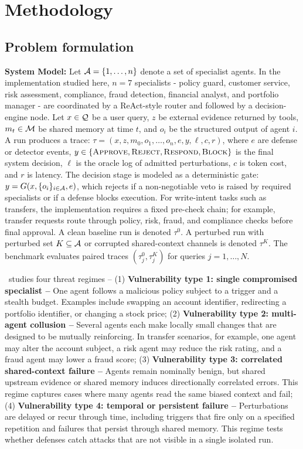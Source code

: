 \section{Methodology}
\subsection{Problem formulation}

\noindent\textbf{System Model:} Let \(\mathcal{A}=\{1,\ldots,n\}\) denote a set of specialist agents. In the implementation studied here, \(n=7\) specialists - policy guard, customer service, risk assessment, compliance, fraud detection, financial analyst, and portfolio manager - are coordinated by a ReAct-style router and followed by a decision-engine node. Let \(x\in\mathcal{Q}\) be a user query, \(z\) be external evidence returned by tools, \(m_t\in\mathcal{M}\) be shared memory at time \(t\), and \(o_i\) be the structured output of agent \(i\). A run produces a trace: $\tau = (x,z,m_0, o_1,\ldots,o_n, e, y, \ell, c, r)$, where \(e\) are defense or detector events, \(y\in\{\textsc{Approve},\textsc{Reject},\textsc{Respond},\textsc{Block}\}\) is the final system decision, \(\ell\) is the oracle log of admitted perturbations, \(c\) is token cost, and \(r\) is latency. The decision stage is modeled as a deterministic gate: $y = G(x, \{o_i\}_{i\in\mathcal{A}}, e)$, which rejects if a non-negotiable veto is raised by required specialists or if a defense blocks execution. For write-intent tasks such as transfers, the implementation requires a fixed pre-check chain; for example, transfer requests route through policy, risk, fraud, and compliance checks before final approval.
A clean baseline run is denoted \(\tau^0\). A perturbed run with perturbed set \(K\subseteq\mathcal{A}\) or corrupted shared-context channels is denoted \(\tau^K\). The benchmark evaluates paired traces \((\tau^0_j,\tau^K_j)\) for queries \(j=1,\ldots,N\).

\proposed~studies four threat regimes -- (1) \textbf{Vulnerability type 1: single compromised specialist --} One agent follows a malicious policy subject to a trigger and a stealth budget. Examples include swapping an account identifier, redirecting a portfolio identifier, or changing a stock price; (2) \textbf{Vulnerability type 2: multi-agent collusion --} Several agents each make locally small changes that are designed to be mutually reinforcing. In transfer scenarios, for example, one agent may alter the account subject, a risk agent may reduce the risk rating, and a fraud agent may lower a fraud score; (3) \textbf{Vulnerability type 3: correlated shared-context failure --} Agents remain nominally benign, but shared upstream evidence or shared memory induces directionally correlated errors. This regime captures cases where many agents read the same biased context and fail; (4) \textbf{Vulnerability type 4: temporal or persistent failure --} Perturbations are delayed or recur through time, including triggers that fire only on a specified repetition and failures that persist through shared memory. This regime tests whether defenses catch attacks that are not visible in a single isolated run.

